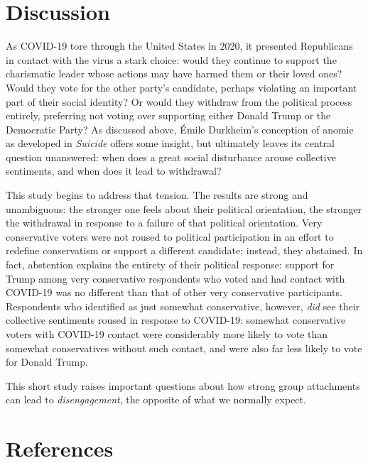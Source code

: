 \documentclass[
  12pt,
]{article}
\begin{document}
\hypertarget{discussion}{%
\section*{Discussion}\label{discussion}}

As COVID-19 tore through the United States in 2020, it presented Republicans in contact with the virus a stark choice: would they continue to support the charismatic leader whose actions may have harmed them or their loved ones? Would they vote for the other party's candidate, perhaps violating an important part of their social identity? Or would they withdraw from the political process entirely, preferring not voting over supporting either Donald Trump or the Democratic Party? As discussed above, Émile Durkheim's conception of anomie as developed in \emph{Suicide} offers some insight, but ultimately leaves its central question unanswered: when does a great social disturbance arouse collective sentiments, and when does it lead to withdrawal?

This study begins to address that tension. The results are strong and unambiguous: the stronger one feels about their political orientation, the stronger the withdrawal in response to a failure of that political orientation. Very conservative voters were not roused to political participation in an effort to redefine conservatism or support a different candidate; instead, they abstained. In fact, abstention explains the entirety of their political response: support for Trump among very conservative respondents who voted and had contact with COVID-19 was no different than that of other very conservative participants. Respondents who identified as just somewhat conservative, however, \emph{did} see their collective sentiments roused in response to COVID-19: somewhat conservative voters with COVID-19 contact were considerably more likely to vote than somewhat conservatives without such contact, and were also far less likely to vote for Donald Trump.

This short study raises important questions about how strong group attachments can lead to \emph{disengagement}, the opposite of what we normally expect.

\newpage

\hypertarget{references}{%
\section*{References}\label{references}}
\end{document}
